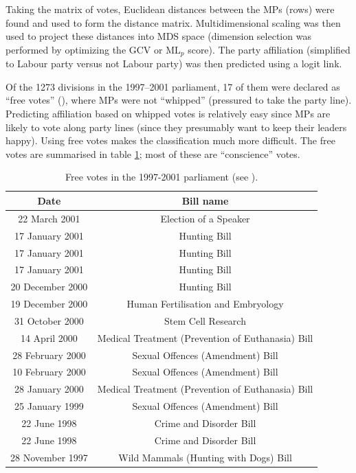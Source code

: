 Taking the matrix of votes, Euclidean distances between the MPs (rows) were found and used to form the distance matrix. Multidimensional scaling was then used to project these distances into MDS space (dimension selection was performed by optimizing the GCV or $\text{ML}_p$ score). The party affiliation (simplified to Labour party versus not Labour party) was then predicted using a logit link.

Of the 1273 divisions in the 1997--2001 parliament, 17 of them were declared  as ``free votes'' (\cite{freevotes}), where MPs were not ``whipped'' (pressured to take the party line). Predicting affiliation based on whipped votes is relatively easy since MPs are likely to vote along party lines (since they presumably want to keep their leaders happy). Using free votes makes the classification much more difficult. The free votes are summarised in table \ref{free-vote-description}; most of these are ``conscience'' votes.

\begin{table}  
\begin{centering}
\begin{tabular}{cc}
	Date & Bill name \\
    \hline
22 March 2001    &   Election of a Speaker \\
17 January 2001  &   Hunting Bill \\
17 January 2001  &   Hunting Bill \\
17 January 2001  &   Hunting Bill\\
20 December 2000 &   Hunting Bill \\
19 December 2000 &   Human Fertilisation and Embryology\\
31 October 2000  &   Stem Cell Research \\
14 April 2000    &   Medical Treatment (Prevention of Euthanasia) Bill \\
28 February 2000 &   Sexual Offences (Amendment) Bill \\
10 February 2000 &   Sexual Offences (Amendment) Bill \\
28 January 2000  &   Medical Treatment (Prevention of Euthanasia) Bill\\
25 January 1999  &   Sexual Offences (Amendment) Bill\\
22 June 1998     &  Crime and Disorder Bill \\
22 June 1998     &  Crime and Disorder Bill \\
28 November 1997 &  Wild Mammals (Hunting with Dogs) Bill\\
  \end{tabular}
\caption{Free votes in the 1997-2001 parliament (see \cite{freevotes}).}
\end{centering}
\label{free-vote-description}
\end{table}

